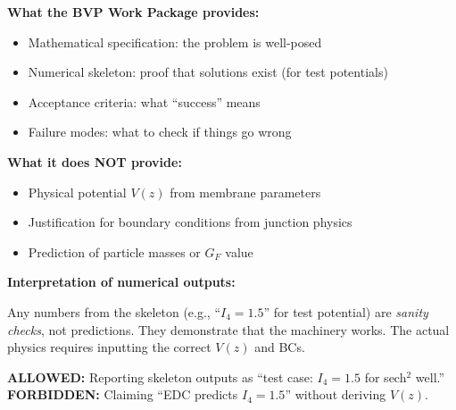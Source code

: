 
\begin{tcolorbox}[colback=cyan!5!white, colframe=cyan!50!black,
    title=\textbf{Consistency Check: This Is Infrastructure, Not a Result}]

\textbf{What the BVP Work Package provides:}
\begin{itemize}[nosep]
    \item Mathematical specification: the problem is well-posed
    \item Numerical skeleton: proof that solutions exist (for test potentials)
    \item Acceptance criteria: what ``success'' means
    \item Failure modes: what to check if things go wrong
\end{itemize}

\textbf{What it does NOT provide:}
\begin{itemize}[nosep]
    \item Physical potential $V(z)$ from membrane parameters
    \item Justification for boundary conditions from junction physics
    \item Prediction of particle masses or $G_F$ value
\end{itemize}

\textbf{Interpretation of numerical outputs:}

Any numbers from the skeleton (e.g., ``$I_4 = 1.5$'' for test potential) are
\emph{sanity checks}, not predictions. They demonstrate that the machinery works.
The actual physics requires inputting the correct $V(z)$ and BCs.

\textbf{ALLOWED:} Reporting skeleton outputs as ``test case: $I_4 = 1.5$ for sech$^2$ well.''\\
\textbf{FORBIDDEN:} Claiming ``EDC predicts $I_4 = 1.5$'' without deriving $V(z)$.
\end{tcolorbox}


